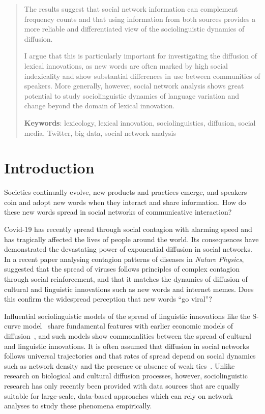 \documentclass[
  a4paper,
  abstract=on,
  captions=tableabove
  ]{scrartcl}
\begin{document}
\begin{abstract}
    The results suggest that social network information can complement frequency counts and that using information from both sources provides a more reliable and differentiated view of the sociolinguistic dynamics of diffusion.

    I argue that this is particularly important for investigating the diffusion of lexical innovations, as new words are often marked by high social indexicality and show substantial differences in use between communities of speakers. More generally, however, social network analysis shows great potential to study sociolinguistic dynamics of language variation and change beyond the domain of lexical innovation.

    \vspace{2\baselineskip}

    \textbf{Keywords}: lexicology, lexical innovation, sociolinguistics, diffusion, social media, Twitter, big data, social network analysis

  \end{abstract}


\section{Introduction}
  \label{sec:intro}

Societies continually evolve, new products and practices emerge, and speakers coin and adopt new words when they interact and share information. How do these new words spread in social networks of communicative interaction?

Covid-19 has recently spread through social contagion with alarming speed and has tragically affected the lives of people around the world. Its consequences have demonstrated the devastating power of exponential diffusion in social networks. In a recent paper analysing contagion patterns of diseases in \emph{Nature Physics}, \textcite{Hebert-Dufresne2020MacroscopicPatterns} suggested that the spread of viruses follows principles of complex contagion through social reinforcement, and that it matches the dynamics of diffusion of cultural and linguistic innovations such as new words and internet memes. Does this confirm the widespread perception that new words \enquote{go viral}?

Influential sociolinguistic models of the spread of linguistic innovations like the S-curve model~\parencite{Milroy1992LinguisticVariation} share fundamental features with earlier economic models of diffusion~\parencite{Rogers1962DiffusionInnovations}, and such models show commonalities between the spread of cultural and linguistic innovations. It is often assumed that diffusion in social networks follows universal trajectories and that rates of spread depend on social dynamics such as network density and the presence or absence of weak ties~\parencite{Granovetter1977StrengthWeak}. Unlike research on biological and cultural diffusion processes, however, sociolinguistic research has only recently been provided with data sources that are equally suitable for large-scale, data-based approaches which can rely on network analyses to study these phenomena empirically.
\end{document}
